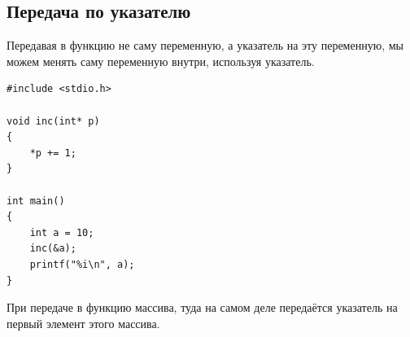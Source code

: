 \documentclass{article}
\begin{document}
\subsection*{Передача по указателю}
Передавая в функцию не саму переменную, а указатель на эту переменную, мы можем менять саму переменную внутри, используя указатель.
\begin{lstlisting}
#include <stdio.h>

void inc(int* p)
{
    *p += 1;
}

int main()
{
    int a = 10;
    inc(&a);
    printf("%i\n", a);
}
\end{lstlisting}

При передаче в функцию массива, туда на самом деле передаётся указатель на первый элемент этого массива.
\end{document}

